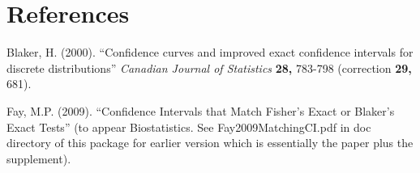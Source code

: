 \documentclass[12pt]{article}
\begin{document}
\section*{References}

\begin{description}
\item Blaker, H. (2000). ``Confidence curves and improved exact confidence intervals for discrete distributions''
{\it Canadian Journal of Statistics} {\bf 28,} 783-798 (correction {\bf 29,} 681).
\item Fay, M.P. (2009). ``Confidence Intervals that Match Fisher's Exact or Blaker's Exact Tests'' (to appear Biostatistics. 
See Fay2009MatchingCI.pdf in doc 
directory of this package for earlier version which is essentially the paper plus the supplement).
\end{description}
\end{document}
